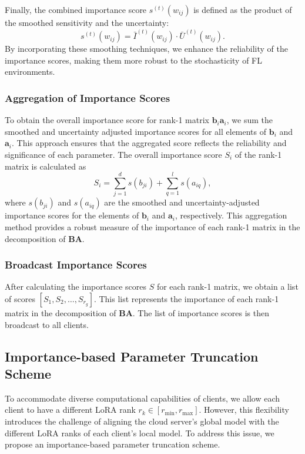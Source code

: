 \documentclass[journal]{IEEEtran}
\begin{document}
Finally, the combined importance score \(s^{(t)}(w_{ij})\) is defined as the product of the smoothed sensitivity and the uncertainty:
\begin{equation}
s^{(t)}(w_{ij}) = \bar{I}^{(t)}(w_{ij}) \cdot \bar{U}^{(t)}(w_{ij}).
\end{equation}
By incorporating these smoothing techniques, we enhance the reliability of the importance scores, making them more robust to the stochasticity of FL environments.

\subsubsection{Aggregation of Importance Scores}
To obtain the overall importance score for rank-1 matrix \(\mathbf{b}_i \mathbf{a}_i\), we sum the smoothed and uncertainty adjusted importance scores for all elements of \(\mathbf{b}_i\) and \(\mathbf{a}_i\). This approach ensures that the aggregated score reflects the reliability and significance of each parameter. The overall importance score \(S_i\) of the rank-1 matrix is calculated as
\begin{equation}
S_i = \sum_{j=1}^{d} s(b_{ji}) + \sum_{q=1}^{l} s(a_{iq}),
\end{equation}
where \(s(b_{ji})\) and \(s(a_{iq})\) are the smoothed and uncertainty-adjusted importance scores for the elements of \(\mathbf{b}_i\) and \(\mathbf{a}_i\), respectively. This aggregation method provides a robust measure of the importance of each rank-1 matrix in the decomposition of \(\mathbf{B}\mathbf{A}\).

\subsubsection{Broadcast Importance Scores}
After calculating the importance scores \(S\) for each rank-1 matrix, we obtain a list of scores \(\left[S_1, S_2, \ldots, S_{r_g}\right]\). This list represents the importance of each rank-1 matrix in the decomposition of \(\mathbf{B}\mathbf{A}\). The list of importance scores is then broadcast to all clients.


\subsection{Importance-based Parameter Truncation Scheme}
To accommodate diverse computational capabilities of clients, we allow each client to have a different LoRA rank \(r_k\in[r_{\text{min}}, r_{\text{max}}]\). However, this flexibility introduces the challenge of aligning the cloud server's global model with the different LoRA ranks of each client’s local model. To address this issue, we propose an importance-based parameter truncation scheme.
\end{document}
